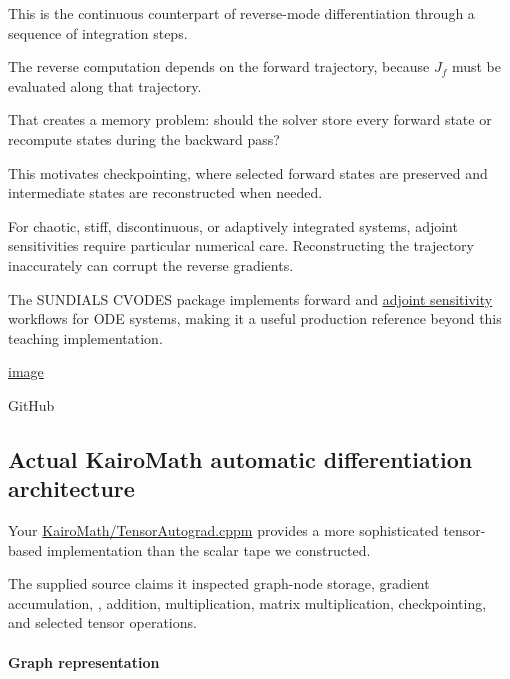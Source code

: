This is the continuous counterpart of reverse-mode differentiation through a sequence of integration steps.

The reverse computation depends on the forward trajectory, because \(J_f\) must be evaluated along that trajectory.

That creates a memory problem: should the solver store every forward state or recompute states during the backward pass?

This motivates checkpointing, where selected forward states are preserved and intermediate states are reconstructed when needed.

For chaotic, stiff, discontinuous, or adaptively integrated systems, adjoint sensitivities require particular numerical care. Reconstructing the trajectory inaccurately can corrupt the reverse gradients.

The SUNDIALS CVODES package implements forward and \hyperref[02-foundations-ii-ch022-numerical-differentiation-and-automatic-differentiation]{adjoint sensitivity} workflows for ODE systems, making it a useful production reference beyond this teaching implementation. 

\href{https://www.google.com/s2/favicons?domain=https://github.com&sz=32}{image}

GitHub

\subsection{Actual KairoMath automatic differentiation architecture}\label{02-foundations-ii-ch022-actual-kairomath-automatic-differentiation-architecture}

\hypertarget{02-foundations-ii-ch022-actual-kairomath-automatic-differentiation-architecture}{}

Your \href{https://github.com/swayam8624/KairoMath/blob/master/TensorAutograd.cppm?utm_source=chatgpt.com}{KairoMath/TensorAutograd.cppm} provides a more sophisticated tensor-based implementation than the scalar tape we constructed.

The supplied source claims it inspected graph-node storage, gradient accumulation, , addition, multiplication, matrix multiplication, checkpointing, and selected tensor operations.

\paragraph{Graph representation}\label{02-foundations-ii-ch022-graph-representation}

